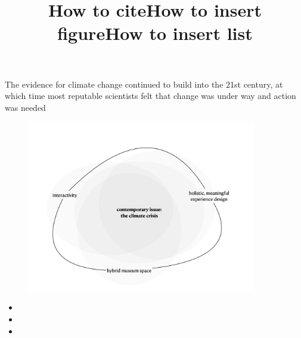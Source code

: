 

\title{How to cite}
The evidence for climate change continued to build into the 21st century, at which time most reputable scientists felt that change was under way and action was needed \cite{hebda_museums_2007}

\title{How to insert figure}

\begin{figure}[h]
\includegraphics[width=10cm]{pictures/problem_sphere.png}
\caption{}
\autocite[]{}
\centering 
\end{figure}


\title{How to insert list}

\begin{itemize}
    \item 
    \item
    \item
\end{itemize}



